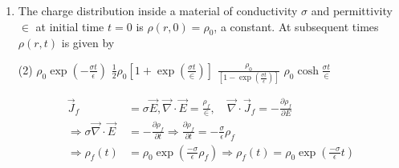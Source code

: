 \begin{enumerate}
	{}
	\begin{tasks}(4)
		\task[\textbf{a.}] $a k r^{2} e^{-a t}$
		\task[\textbf{b.}] $2 a k r^{2} e^{-a t}$
		\task[\textbf{c.}] $-a k r^{2} e^{-a t}$
		\task[\textbf{d.}] $-2 a k r^{2} e^{-a t}$
	\end{tasks}
\begin{answer}
	\begin{align*}
	\intertext{Gauge TransformationGauge Transformation}
	\vec{A}&=\vec{A}+\vec{\nabla} \lambda, \phi^{\prime}=\phi-\frac{\partial \lambda}{\partial t} \Rightarrow \vec{A}-\vec{A}\\&=-2 k e^{-a t} r \hat{r}=\vec{\nabla} \lambda=\frac{\partial \lambda}{\partial r} \hat{r}\\
	\Rightarrow \lambda&=-k e^{-a t} r^{2} \Rightarrow \frac{\partial \lambda}{\partial t}=k a e^{-a t} r^{2}\\
	\Rightarrow \phi^{\prime}-\phi&=-\frac{\partial \lambda}{\partial t}=-k a e^{-a t} r^{2}
	\end{align*}
	So the correct answer is \textbf{Option (c)}
\end{answer}
	\item  The charge distribution inside a material of conductivity $\sigma$ and permittivity $\in$ at initial time $t=0$ is $\rho(r, 0)=\rho_{0}$, a constant. At subsequent times $\rho(r, t)$ is given by
	{}
	\begin{tasks}(2)
		\task[\textbf{a.}]  $\rho_{0} \exp \left(-\frac{\sigma t}{\epsilon}\right)$
		\task[\textbf{b.}] $\frac{1}{2} \rho_{0}\left[1+\exp \left(\frac{\sigma t}{\in}\right)\right]$
		\task[\textbf{c.}]  $\frac{\rho_{0}}{\left[1-\exp \left(\frac{\sigma t}{\epsilon}\right)\right]}$
		\task[\textbf{d.}] $\rho_{0} \cosh \frac{\sigma t}{\in}$
	\end{tasks}
\begin{answer}
	\begin{align*}
	\vec{J}_{f}&=\sigma \vec{E}, \vec{\nabla} \cdot \vec{E}=\frac{\rho_{f}}{\in}, \quad \vec{\nabla} \cdot \vec{J}_{f}=-\frac{\partial \rho_{f}}{\partial E}\\
	\Rightarrow \sigma \vec{\nabla} \cdot \vec{E}&=-\frac{\partial \rho_{f}}{\partial t} \Rightarrow \frac{\partial \rho_{f}}{\partial t}=-\frac{\sigma}{\epsilon} \rho_{f}\\
	\Rightarrow \rho_{f}(t)&=\rho_{0} \exp \left(\frac{-\sigma}{\epsilon} \rho_{f}\right) \Rightarrow \rho_{f}(t)=\rho_{0} \exp \left(\frac{-\sigma}{\epsilon} t\right)
	\end{align*}

\end{answer}
\end{enumerate}
